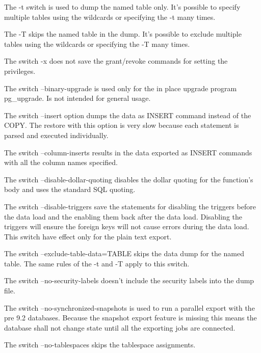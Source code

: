 The -t switch is used to dump the named table only. It's possible to specify multiple tables using
the wildcards or specifying the -t many times.\newline

The -T skips the named table in the dump. It's possible to exclude multiple tables using
the wildcards or specifying the -T many times.\newline

The switch -x does not save the grant/revoke commands for setting the privileges.\newline

The switch --binary-upgrade is used only for the in place upgrade program pg\_upgrade. Is not intended for
general usage.

The switch --insert option dumps the data as INSERT command instead of the COPY. The restore with this
option is very slow because each statement is parsed and executed individually.\newline

The switch --column-inserts results in the data exported as INSERT commands with all the column
names specified.\newline

The switch --disable-dollar-quoting disables the dollar quoting for the function's body and uses the
standard SQL quoting.\newline

The switch --disable-triggers save the statements for disabling  the triggers before the data load and the
enabling them back after the data load. Disabling the triggers will ensure the foreign keys will not cause
errors during the data load. This switch have effect only for the plain text export.\newline

The switch --exclude-table-data=TABLE skips the data dump for the named table. The same rules of the -t and
-T apply to this switch.\newline


The switch --no-security-labels doesn't include the security labels into the dump file.\newline

The switch --no-synchronized-snapshots  is used to run a parallel export with the pre 9.2
databases. Because the snapshot export feature is missing this means the database shall not change
state until all the exporting jobs are connected.\newline

The switch --no-tablespaces skips the tablespace assignments.\newline

